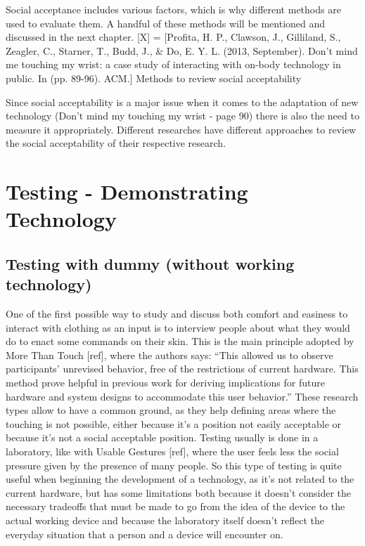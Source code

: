 \documentclass{sigchi}
\begin{document}
Social acceptance includes various factors, which is why different methods are used to evaluate them. A handful of these methods will be mentioned and discussed in the next chapter.
[X] = [Profita, H. P., Clawson, J., Gilliland, S., Zeagler, C., Starner, T., Budd, J., \& Do, E. Y. L.
(2013, September). Don't mind me touching my wrist: a case study of interacting with on-body
technology in public. In
(pp. 89-96). ACM.]
Methods to review social acceptability
%

Since social acceptability is a major issue when it comes to the adaptation of new technology (Don’t mind my touching my wrist - page 90) there is also the need to measure it appropriately. Different researches have different approaches to review the social acceptability of their respective research.
\section{Testing - Demonstrating Technology}

\subsection{Testing with dummy (without working technology)}
One of the first possible way to study and discuss both comfort and easiness  to interact with clothing as an input is to interview people about what they would do to enact some commands on their skin. This is the main principle adopted by More Than Touch [ref], where the authors says: “This allowed us to observe participants’ unrevised behavior, free of the restrictions of current hardware. This method prove helpful in previous work for deriving implications for future hardware and system designs to accommodate this user behavior.”
These research types allow to have a common ground, as they help defining areas where the touching is not possible, either because it’s a position not easily acceptable or because it’s not a social acceptable position. Testing usually is done in a laboratory, like with Usable Gestures [ref], where the user feels less the social pressure given by the presence of many people. So this type of testing is quite useful when beginning the development of a technology, as it’s not related to the current hardware, but has some limitations both because it doesn’t consider the necessary tradeoffs that must be made to go from the idea of the device to the actual working device and because the laboratory itself doesn’t reflect the everyday situation that a person and a device will encounter on.
\end{document}
